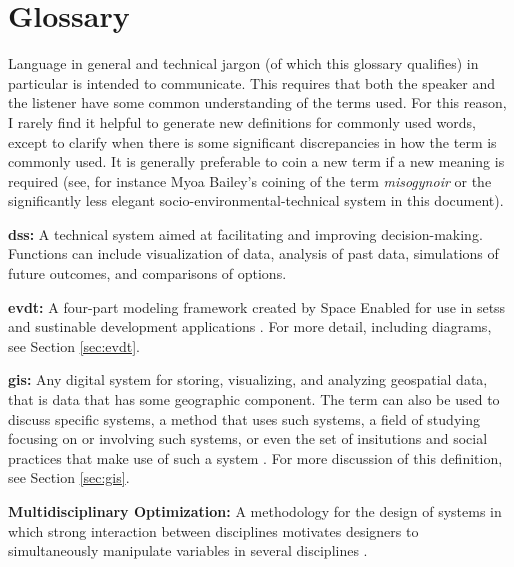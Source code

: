 \documentclass[notitlepage]{article}
\begin{document}
\newpage


\section*{Glossary}

Language in general and technical jargon (of which this glossary qualifies) in particular is intended to communicate. This requires that both the speaker and the listener have some common understanding of the terms used. For this reason, I rarely find it helpful to generate new definitions for commonly used words, except to clarify when there is some significant discrepancies in how the term is commonly used. It is generally preferable to coin a new term if a new meaning is required (see, for instance Myoa Bailey's coining of the term \textit{misogynoir} \cite{baileyMoreOriginMisogynoir} or the significantly less elegant socio-environmental-technical system in this document).  


\textbf{\acf{dss}:} A technical system aimed at facilitating and improving decision-making. Functions can include visualization of data, analysis of past data, simulations of future outcomes, and comparisons of options.

\textbf{\acf{evdt}:} A four-part modeling framework created by Space Enabled for use in \acp{sets} and sustinable development applications \cite{reidCombiningSocialEnvironmental2019}. For more detail, including diagrams, see Section \ref{sec:evdt}.

\textbf{\acf{gis}:} Any digital system for storing, visualizing, and analyzing geospatial data, that is data that has some geographic component. The term can also be used to discuss specific systems, a method that uses such systems, a field of studying focusing on or involving such systems, or even the set of insitutions and social practices that make use of such a system \cite{sheppardGISSocietyResearch1995}. For more discussion of this definition, see Section \ref{sec:gis}.

\textbf{Multidisciplinary Optimization:} A methodology for the design of systems in which strong interaction between disciplines motivates designers to simultaneously manipulate variables in several disciplines \cite{sobieszczanski-sobieskiMultidisciplinaryAerospaceDesign1997}.
\end{document}
